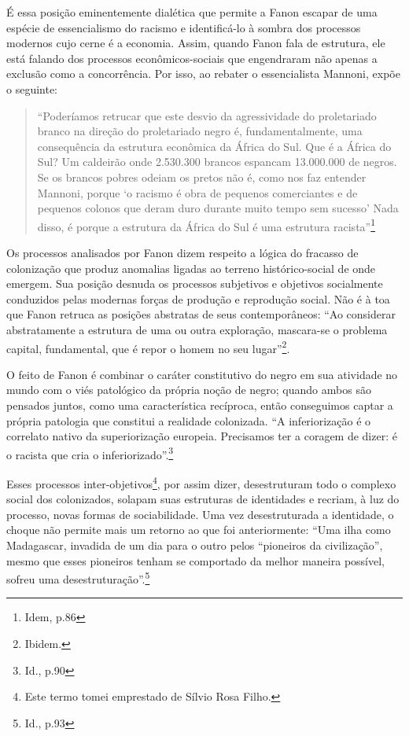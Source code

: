 É essa posição eminentemente dialética que permite a Fanon escapar de
uma espécie de essencialismo do racismo e identificá-lo à sombra dos
processos modernos cujo cerne é a economia. Assim, quando Fanon fala de
estrutura, ele está falando dos processos econômicos-sociais que
engendraram não apenas a exclusão como a concorrência. Por isso, ao
rebater o essencialista Mannoni, expõe o seguinte:

\begin{quote}
``Poderíamos retrucar que este desvio da agressividade do proletariado
branco na direção do proletariado negro é, fundamentalmente, uma
consequência da estrutura econômica da África do Sul. Que é a África do
Sul? Um caldeirão onde 2.530.300 brancos espancam 13.000.000 de negros.
Se os brancos pobres odeiam os pretos não é, como nos faz entender
Mannoni, porque `o racismo é obra de pequenos comerciantes e de pequenos
colonos que deram duro durante muito tempo sem sucesso' Nada disso, é
porque a estrutura da África do Sul é uma estrutura racista''\footnote{Idem,
  p.86}
\end{quote}

Os processos analisados por Fanon dizem respeito a lógica do fracasso de
colonização que produz anomalias ligadas ao terreno histórico-social de
onde emergem. Sua posição desnuda os processos subjetivos e objetivos
socialmente conduzidos pelas modernas forças de produção e reprodução
social. Não é à toa que Fanon retruca as posições abstratas de seus
contemporâneos: ``Ao considerar abstratamente a estrutura de uma ou
outra exploração, mascara-se o problema capital, fundamental, que é
repor o homem no seu lugar''\footnote{Ibidem.}.

O feito de Fanon é combinar o caráter constitutivo do negro em sua
atividade no mundo com o viés patológico da própria noção de negro;
quando ambos são pensados juntos, como uma característica recíproca,
então conseguimos captar a própria patologia que constitui a realidade
colonizada. ``A inferiorização é o correlato nativo da superiorização
europeia. Precisamos ter a coragem de dizer: é o racista que cria o
inferiorizado''.\footnote{Id., p.90}

Esses processos inter-objetivos\footnote{Este termo tomei emprestado de
  Sílvio Rosa Filho.}, por assim dizer, desestruturam todo o complexo
social dos colonizados, solapam suas estruturas de identidades e
recriam, à luz do processo, novas formas de sociabilidade. Uma vez
desestruturada a identidade, o choque não permite mais um retorno ao que
foi anteriormente: ``Uma ilha como Madagascar, invadida de um dia para o
outro pelos ``pioneiros da civilização'', mesmo que esses pioneiros
tenham se comportado da melhor maneira possível, sofreu uma
desestruturação''.\footnote{Id., p.93}

